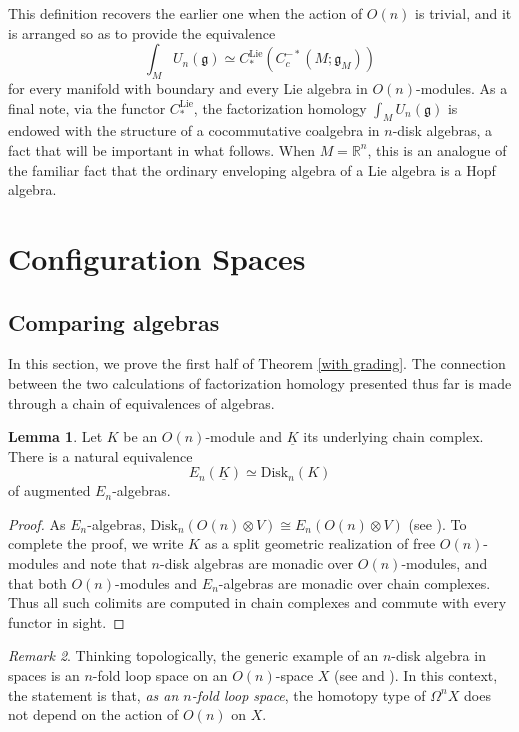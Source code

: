 \documentclass{compositio}
\theoremstyle{definition}\newtheorem{definition}{Definition}[section]
\theoremstyle{theorem}\newtheorem{lemma}[definition]{Lemma}
\theoremstyle{remark}\newtheorem*{conventions}{Conventions}
\theoremstyle{remark}\newtheorem*{acknowledgments}{Acknowledgments}
\theoremstyle{remark}\newtheorem*{outline}{Outline}
\theoremstyle{remark}\newtheorem*{questions}{Questions}
\theoremstyle{remark}\newtheorem{example}[definition]{Example}
\theoremstyle{definition}\newtheorem{construction}[definition]{Construction}
\theoremstyle{definition}\newtheorem*{convention}{Convention}
\theoremstyle{definition}\newtheorem*{conjecture}{Conjecture}
\theoremstyle{theorem}\newtheorem{theorem}[definition]{Theorem}
\theoremstyle{theorem}\newtheorem{paradigm}[definition]{Paradigm}
\theoremstyle{remark}\newtheorem{remark}[definition]{Remark}
\theoremstyle{corollary}\newtheorem{corollary}[definition]{Corollary}
\theoremstyle{theorem}\newtheorem{proposition}[definition]{Proposition}
\theoremstyle{definition}\newtheorem{question}[definition]{Question}
\begin{document}
This definition recovers the earlier one when the action of $O(n)$ is trivial, and it is arranged so as to provide the equivalence $$\int_M U_n(\mathfrak{g})\simeq C_*^{\mathrm{Lie}}(C_c^{-*}(M;\mathfrak{g}_M))$$ for every manifold with boundary and every Lie algebra in $O(n)$-modules. As a final note, via the functor $C_*^{\mathrm{Lie}}$, the factorization homology $\int_MU_n(\mathfrak{g})$ is endowed with the structure of a cocommutative coalgebra in $n$-disk algebras, a fact that will be important in what follows. When $M=\mathbb{R}^n$, this is an analogue of the familiar fact that the ordinary enveloping algebra of a Lie algebra is a Hopf algebra. 

\section{Configuration Spaces}

\subsection{Comparing algebras} \label{proof one} In this section, we prove the first half of Theorem \ref{with grading}. The connection between the two calculations of factorization homology presented thus far is made through a chain of equivalences of algebras.

\begin{lemma}
Let $K$ be an $O(n)$-module and $\underline{K}$ its underlying chain complex. There is a natural equivalence $$E_n(\underline{K})\simeq {\mathrm{Disk}}_n(K)$$ of augmented $E_n$-algebras.
\end{lemma}
\begin{proof} 
As $E_n$-algebras, ${\mathrm{Disk}}_n(O(n)\otimes V)\cong E_n(O(n)\otimes V)$ (see \cite{Wahl}). To complete the proof, we write $K$ as a split geometric realization of free $O(n)$-modules and note that $n$-disk algebras are monadic over $O(n)$-modules, and that both $O(n)$-modules and $E_n$-algebras are monadic over chain complexes. Thus all such colimits are computed in chain complexes and commute with every functor in sight.
\end{proof}

\begin{remark}
Thinking topologically, the generic example of an $n$-disk algebra in spaces is an $n$-fold loop space on an $O(n)$-space $X$ (see \cite{SalvatoreWahl} and \cite{Wahl}). In this context, the statement is that, \emph{as an $n$-fold loop space}, the homotopy type of $\Omega^n X$ does not depend on the action of $O(n)$ on $X$. 
\end{remark}
\end{document}
